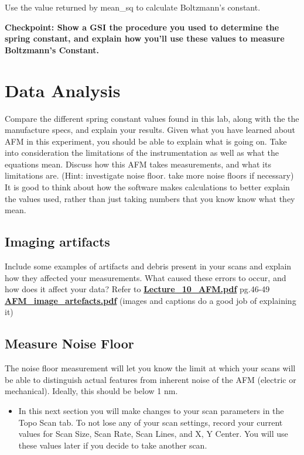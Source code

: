 \documentclass{../lab}
\begin{document}
{Use the value returned by mean\_sq to calculate Boltzmann’s constant.

\textbf{Checkpoint: Show a GSI the procedure you used to determine the spring constant, and explain how you'll use these values to measure Boltzmann's Constant.}

\section{Data Analysis}
Compare the different spring constant values found in this lab, along with the the manufacture specs, and explain your results.  Given what you have learned about AFM in this experiment, you should be able to explain what is going on.
Take into consideration the limitations of the instrumentation as well as what the equations mean.  Discuss how this AFM takes measurements, and what its limitations are.   (Hint: investigate noise floor. take more noise floors if necessary)
It is good to think about how the software makes calculations to better explain the values used, rather than just taking numbers that you know know what they mean.


\subsection{Imaging artifacts}
Include some examples of  artifacts and debris present in your scans and explain how they affected your measurements.  What caused these errors to occur, and how does it affect your data?
Refer to \href{http://experimentationlab.berkeley.edu/sites/default/files/AFMImages/Lecture\_10\_AFM.pdf}{\textbf{Lecture\_10\_AFM.pdf}}  pg.46-49
         \href{http://experimentationlab.berkeley.edu/sites/default/files/AFMImages/AFM\_image\_artefacts.pdf}{\textbf{AFM\_image\_artefacts.pdf}} (images and captions do a good job of explaining it)

\subsection{Measure Noise Floor}
The noise floor measurement will let you know the limit at which your scans will be able to distinguish actual features from inherent noise of the AFM (electric or mechanical).  Ideally, this should be below 1 nm.

    \begin{itemize}
        \item In this next section you will make changes to your scan parameters in the Topo Scan tab.  To not lose any of your scan settings, record your current values for Scan Size, Scan Rate, Scan Lines, and X, Y Center.  You will use these values later if you decide to take another scan.


\end{itemize}}
\end{document}
